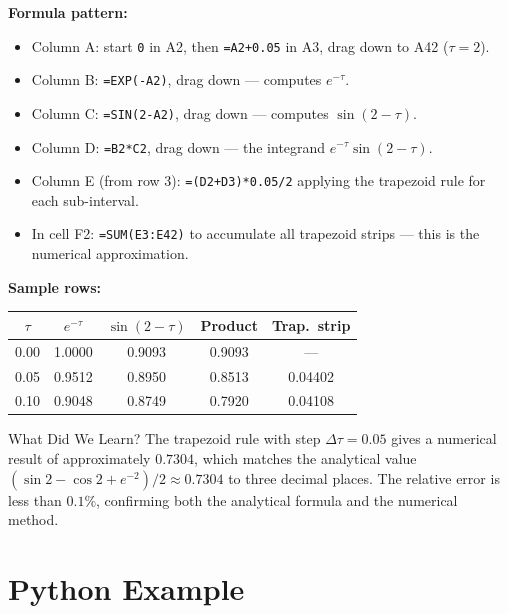 \documentclass[12pt,a4paper]{article}
\begin{document}
\textbf{Formula pattern:}
\begin{itemize}
\item Column A: start \texttt{0} in A2, then \texttt{=A2+0.05} in A3, drag down to A42 ($\tau = 2$).
\item Column B: \texttt{=EXP(-A2)}, drag down --- computes $e^{-\tau}$.
\item Column C: \texttt{=SIN(2-A2)}, drag down --- computes $\sin(2-\tau)$.
\item Column D: \texttt{=B2*C2}, drag down --- the integrand $e^{-\tau}\sin(2-\tau)$.
\item Column E (from row 3): \texttt{=(D2+D3)*0.05/2} applying the trapezoid rule for each sub-interval.
\item In cell F2: \texttt{=SUM(E3:E42)} to accumulate all trapezoid strips --- this is the numerical approximation.
\end{itemize}

\textbf{Sample rows:}
\begin{center}
\begin{tabular}{@{}ccccc@{}}
\toprule
$\tau$ & $e^{-\tau}$ & $\sin(2-\tau)$ & Product & Trap.\ strip \\
\midrule
0.00 & 1.0000 & 0.9093 & 0.9093 & --- \\
0.05 & 0.9512 & 0.8950 & 0.8513 & 0.04402 \\
0.10 & 0.9048 & 0.8749 & 0.7920 & 0.04108 \\
\bottomrule
\end{tabular}
\end{center}

\begin{learnbox}{What Did We Learn?}
The trapezoid rule with step $\Delta\tau = 0.05$ gives a numerical result of
approximately $0.7304$, which matches the analytical value
$(\sin 2 - \cos 2 + e^{-2})/2 \approx 0.7304$ to three decimal places. The
relative error is less than $0.1\%$, confirming both the analytical formula
and the numerical method.
\end{learnbox}

\section{Python Example }
\end{document}
